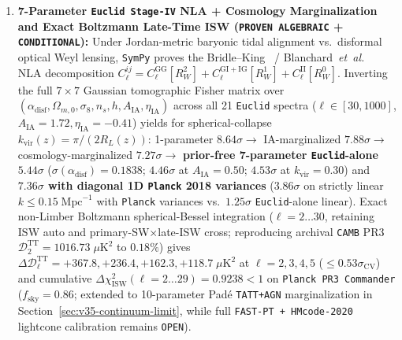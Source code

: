 \documentclass[11pt,a4paper]{article}
\begin{document}
\begin{enumerate}
\item \textbf{7-Parameter \texttt{Euclid Stage-IV} NLA + Cosmology Marginalization and Exact Boltzmann Late-Time ISW (\texttt{PROVEN ALGEBRAIC} + \texttt{CONDITIONAL}):} Under Jordan-metric baryonic tidal alignment vs.\ disformal optical Weyl lensing, \texttt{SymPy} proves the Bridle--King~\cite{BridleKing2007} / Blanchard~\textit{et~al.}~\cite{Blanchard2020} NLA decomposition $C_\ell^{ij} = C_\ell^{\mathrm{GG}}[R_W^2] + C_\ell^{\mathrm{GI+IG}}[R_W^1] + C_\ell^{\mathrm{II}}[R_W^0]$. Inverting the full $7\times 7$ Gaussian tomographic Fisher matrix over $(\alpha_{\mathrm{disf}},\Omega_{m,0},\sigma_8,n_s,h,A_{\mathrm{IA}},\eta_{\mathrm{IA}})$ across all 21 \texttt{Euclid} spectra ($\ell\in[30,1000]$, $A_{\mathrm{IA}}=1.72, \eta_{\mathrm{IA}}=-0.41$) yields for spherical-collapse $k_{\mathrm{vir}}(z)=\pi/(2R_L(z))$: 1-parameter $8.64\sigma \to$ IA-marginalized $7.88\sigma \to$ cosmology-marginalized $7.27\sigma \to$ \textbf{prior-free 7-parameter \texttt{Euclid}-alone $5.44\sigma$} ($\sigma(\alpha_{\mathrm{disf}})=0.1838$; $4.46\sigma$ at $A_{\mathrm{IA}}=0.50$; $4.53\sigma$ at $k_{\mathrm{vir}}=0.30$) and \textbf{$7.36\sigma$ with diagonal 1D \texttt{Planck} 2018 variances} ($3.86\sigma$ on strictly linear $k\le 0.15\;\mathrm{Mpc}^{-1}$ with \texttt{Planck} variances vs.\ $1.25\sigma$ \texttt{Euclid}-alone linear). Exact non-Limber Boltzmann spherical-Bessel integration ($\ell=2\dots 30$, retaining ISW auto and primary-SW$\times$late-ISW cross; reproducing archival \texttt{CAMB} PR3 $\mathcal{D}_2^{\mathrm{TT}}=1016.73\;\mu\mathrm{K}^2$ to $0.18\%$) gives $\Delta\mathcal{D}_\ell^{\mathrm{TT}} = +367.8, +236.4, +162.3, +118.7\;\mu\mathrm{K}^2$ at $\ell=2,3,4,5$ ($\le 0.53\sigma_{\mathrm{CV}}$) and cumulative \textbf{$\Delta\chi^2_{\mathrm{ISW}}(\ell=2\dots 29) = 0.9238 < 1$} on \texttt{Planck PR3 Commander} ($f_{\mathrm{sky}}=0.86$; extended to 10-parameter Pad\'e \texttt{TATT+AGN} marginalization in Section~\ref{sec:v35-continuum-limit}, while full \texttt{FAST-PT + HMcode-2020} lightcone calibration remains \texttt{OPEN}).
\end{enumerate}
\end{document}
